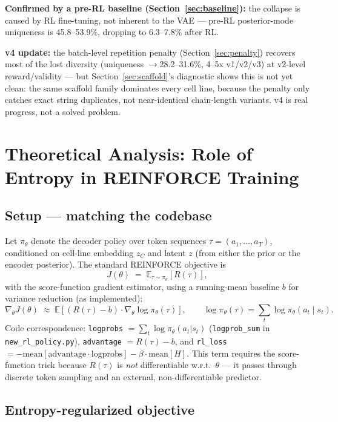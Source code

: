 \documentclass[11pt]{article}
\newcommand{\code}[1]{\texttt{#1}}
\begin{document}
\textbf{Confirmed by a pre-RL baseline (Section~\ref{sec:baseline}):} the collapse is caused by RL fine-tuning, not inherent to the VAE --- pre-RL posterior-mode uniqueness is 45.8--53.9\%, dropping to 6.3--7.8\% after RL.

\textbf{v4 update:} the batch-level repetition penalty (Section~\ref{sec:penalty}) recovers most of the lost diversity (uniqueness $\to$28.2--31.6\%, 4--5x v1/v2/v3) at v2-level reward/validity --- but Section~\ref{sec:scaffold}'s diagnostic shows this is not yet clean: the same scaffold family dominates every cell line, because the penalty only catches exact string duplicates, not near-identical chain-length variants. v4 is real progress, not a solved problem.

\section{Theoretical Analysis: Role of Entropy in REINFORCE Training}
\label{sec:theory}

\subsection{Setup --- matching the codebase}

Let $\pi_\theta$ denote the decoder policy over token sequences $\tau = (a_1, \ldots, a_T)$, conditioned on cell-line embedding $z_C$ and latent $z$ (from either the prior or the encoder posterior). The standard REINFORCE objective is
\[
  J(\theta) \;=\; \mathbb{E}_{\tau \sim \pi_\theta}\!\left[ R(\tau) \right],
\]
with the score-function gradient estimator, using a running-mean baseline $b$ for variance reduction (as implemented):
\[
  \nabla_\theta J(\theta) \;\approx\; \mathbb{E}\!\left[ \left(R(\tau) - b\right) \cdot \nabla_\theta \log \pi_\theta(\tau) \right],
  \qquad
  \log \pi_\theta(\tau) = \sum_{t} \log \pi_\theta(a_t \mid s_t).
\]
Code correspondence: \code{logprobs} $= \sum_t \log \pi_\theta(a_t|s_t)$ (\code{logprob\_sum} in \code{new\_rl\_policy.py}), \code{advantage} $= R(\tau) - b$, and \code{rl\_loss} $= -\text{mean}[\text{advantage} \cdot \text{logprobs}] - \beta \cdot \text{mean}[H]$. This term requires the score-function trick because $R(\tau)$ is \emph{not} differentiable w.r.t.\ $\theta$ --- it passes through discrete token sampling and an external, non-differentiable predictor.

\subsection{Entropy-regularized objective}
\end{document}
